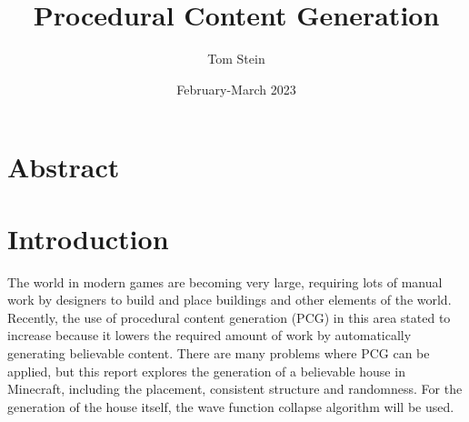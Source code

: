 \documentclass[
oneside,
fontsize=11pt
]{scrartcl}
\title{Procedural Content Generation}
\author{Tom Stein}
\date{February-March 2023}
\begin{document}


%






\newpage

 


\section*{Abstract}


\section{Introduction}
The world in modern games are becoming very large, 
requiring lots of manual work by designers 
to build and place buildings and other elements of the world. 
Recently, the use of procedural content generation (PCG) in this area 
stated to increase because it lowers the required amount of work 
by automatically generating believable content. 
There are many problems where PCG can be applied,
but this report explores the generation of a believable house in Minecraft,
including the placement, consistent structure and randomness. 
For the generation of the house itself, 
the wave function collapse algorithm will be used.
\end{document}

